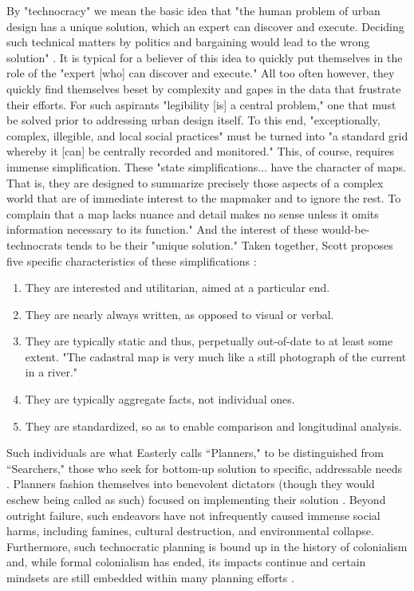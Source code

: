 By "technocracy" we mean the basic idea that "the human problem of urban design has a unique solution, which an expert can discover and execute. Deciding such technical matters by politics and bargaining would lead to the wrong solution" \cite{scottSeeingStateHow2020}. It is typical for a believer of this idea to quickly put themselves in the role of the "expert [who] can discover and execute." All too often however, they quickly find themselves beset by complexity and gapes in the data that frustrate their efforts. For such aspirants "legibility [is] a central problem," one that must be solved prior to addressing urban design itself. To this end, "exceptionally, complex, illegible, and local social practices" must be turned into "a standard grid whereby it [can] be centrally recorded and monitored." This, of course, requires immense simplification. These "state simplifications... have the character of maps. That is, they are designed to summarize precisely those aspects of a complex world that are of immediate interest to the mapmaker and to ignore the rest. To complain that a map lacks nuance and detail makes no sense unless it omits information necessary to its function." And the interest of these would-be-technocrats tends to be their "unique solution." Taken together, Scott proposes five specific characteristics of these simplifications \cite{scottSeeingStateHow2020}:

\begin{enumerate} \setlength{\itemsep}{0pt} \setlength{\parskip}{0pt} 
	\item{They are interested and utilitarian, aimed at a particular end.}
	\item{They are nearly always written, as opposed to visual or verbal.}
	\item{They are typically static and thus, perpetually out-of-date to at least some extent. "The cadastral map is very much like a still photograph of the current in a river."}
	\item{They are typically aggregate facts, not individual ones.}
	\item{They are standardized, so as to enable comparison and longitudinal analysis.}
\end{enumerate}

Such individuals are what Easterly calls ``Planners," to be distinguished from ``Searchers," those who seek for bottom-up solution to specific, addressable needs \cite{easterlyWhiteManBurden2007a}. Planners fashion themselves into benevolent dictators (though they would eschew being called as such) focused on implementing their solution \cite{easterly2015}. Beyond outright failure, such endeavors have not infrequently caused immense social harms, including famines, cultural destruction, and environmental collapse. Furthermore, such technocratic planning is bound up in the history of colonialism and, while formal colonialism has ended, its impacts continue and certain mindsets are still embedded within many planning efforts \cite{sandercockCommentaryIndigenousPlanning2004}.

